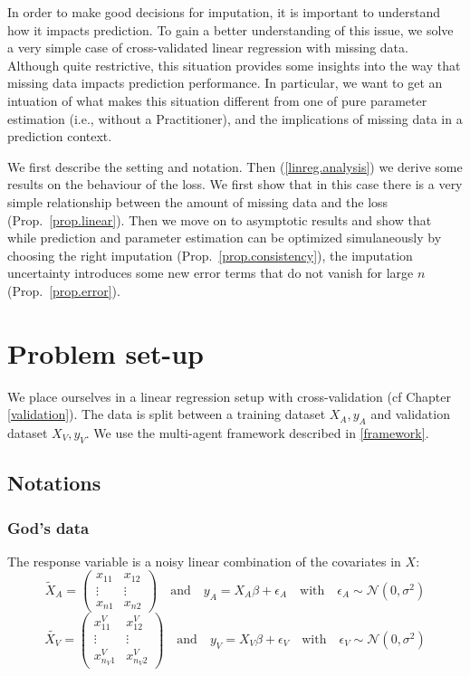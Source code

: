 In order to make good decisions for imputation, it is important to understand how it impacts prediction. To gain a better understanding of this issue, we solve a very simple case of cross-validated linear regression with missing data. Although quite restrictive, this situation provides some insights into the way that missing data impacts prediction performance. In particular, we want to get an intuation of what makes this situation different from one of pure parameter estimation (i.e., without a Practitioner), and the implications of missing data in a prediction context.

We first describe the setting and notation. Then (\ref{linreg.analysis}) we derive some results on the behaviour of the loss. We first show that in this case there is a very simple relationship between the amount of missing data and the loss (Prop.\ \ref{prop.linear}). Then we move on to asymptotic results and show that while prediction and parameter estimation can be optimized simulaneously by choosing the right imputation (Prop.\ \ref{prop.consistency}), the imputation uncertainty introduces some new error terms that do not vanish for large $n$ (Prop.\ \ref{prop.error}).

	\section{Problem set-up}
We place ourselves in a linear regression setup with cross-validation (cf Chapter \ref{validation}). The data is split between a training dataset $X_A, y_A$ and validation dataset $X_V, y_V$. We use the multi-agent framework described in \ref{framework}.
		\subsection{Notations}
			\subsubsection{God's data}
The response variable is a noisy linear combination of the covariates in $X$:
\begin{equation*}
\tilde{X}_A = 
\begin{pmatrix}
x_{11} & x_{12} \\
\vdots & \vdots \\
x_{n1} & x_{n2}
\end{pmatrix}
\quad \mathrm{and} \quad
y_A = X_A \beta + \epsilon_A
\quad \mathrm{with} \quad
\epsilon_A \sim \mathcal{N}(0, \sigma^2)
\end{equation*}
\begin{equation*}
\tilde{X_V} = 
\begin{pmatrix}
x_{11}^V & x_{12}^V \\
\vdots & \vdots \\
x_{n_V1}^V & x_{n_V2}^V
\end{pmatrix}
\quad \mathrm{and} \quad
y_V = X_V \beta + \epsilon_V
\quad \mathrm{with} \quad
\epsilon_V \sim \mathcal{N}(0, \sigma^2)
\end{equation*}

